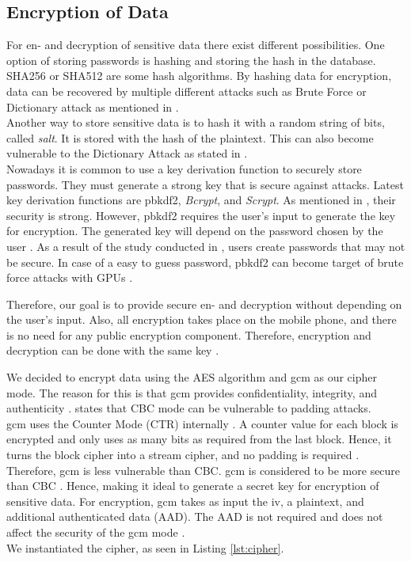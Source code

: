 \subsection{Encryption of Data}\label{arch_encryption}
For en- and decryption of sensitive data there exist different possibilities. One option of storing passwords is hashing and storing the hash in the database. SHA256 or SHA512 are some hash algorithms. By hashing data for encryption, data can be recovered by multiple different attacks such as Brute Force or Dictionary attack as mentioned in \cite{ertaul2016implementation}. \\
Another way to store sensitive data is to hash it with a random string of bits, called \textit{salt}. It is stored with the hash of the plaintext. This can also become vulnerable to the Dictionary Attack as stated in \cite{3wrongways}. \\
Nowadays it is common to use a key derivation function to securely store passwords. They must generate a strong key that is secure against attacks. Latest key derivation functions are \gls{pbkdf2}, \textit{Bcrypt}, and \textit{Scrypt}. As mentioned in \cite{ertaul2016implementation}, their security is strong.
However, \gls{pbkdf2} requires the user's input to generate the key for encryption. The generated key will depend on the password chosen by the user \cite{Agilebits}. As a result of the study conducted in \cite{DBLP:journals/ieeesp/YanBAG04}, users create passwords that may not be secure. In case of a easy to guess password, \gls{pbkdf2} can become target of brute force attacks with GPUs \cite{DBLP:conf/esorics/DurmuthGKPYZ12}.

Therefore, our goal is to provide secure en- and decryption without depending on the user's input. Also, all encryption takes place on the mobile phone, and there is no need for any public encryption component. Therefore, encryption and decryption can be done with the same key \cite{DBLP:journals/ijnsec/ElminaamKH10}.

We decided to encrypt data using the AES algorithm and \gls{gcm} as our cipher mode. The reason for this is that \gls{gcm} provides confidentiality, integrity, and authenticity \cite{AESJavaAndroid}. \cite{GCMSecure} states that CBC mode can be vulnerable to padding attacks. \\
\gls{gcm} uses the Counter Mode (CTR) internally \cite{AESJavaAndroid}. A counter value for each block is encrypted and only uses as many bits as required from the last block. Hence, it turns the block cipher into a stream cipher, and no padding is required \cite{IVtransmission}. Therefore, \gls{gcm} is less vulnerable than CBC. \gls{gcm} is considered to be more secure than CBC \cite{GCMSecure}. Hence, making it ideal to generate a secret key for encryption of sensitive data. For encryption, \gls{gcm} takes as input the \gls{iv}, a plaintext, and additional authenticated data (AAD). The AAD is not required and does not affect the security of the \gls{gcm} mode \cite{AADsecure}. \\
We instantiated the cipher, as seen in Listing \ref{lst:cipher}.

